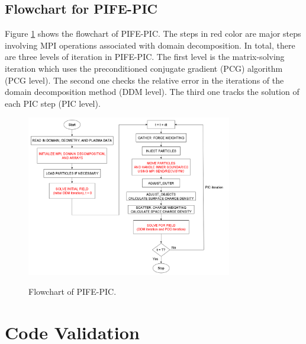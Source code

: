 \documentclass{siamart171218}
\begin{document}
\subsection{Flowchart for PIFE-PIC}

Figure \ref{fig:flowchart:parallel} shows the flowchart of PIFE-PIC.
The steps in red color are major steps involving MPI operations
associated with domain decomposition.
In total, there are three levels of iteration in PIFE-PIC.
The first level is the matrix-solving iteration
which uses the preconditioned conjugate gradient (PCG) algorithm (PCG level).
The second one checks the relative error in the iterations
of the domain decomposition method (DDM level).
The third one tracks the solution of each PIC step (PIC level).


\begin{figure}[ht!]
\centering
{\includegraphics[width=0.8\textwidth]{flowchart_parallel.png}}
\caption{Flowchart of PIFE-PIC.}
\label{fig:flowchart:parallel}
\end{figure}



\section{Code Validation}
\label{sec:validation}
\end{document}
